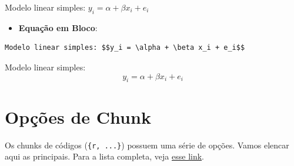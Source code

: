 \documentclass[]{book}
\providecommand{\tightlist}{%
  \setlength{\itemsep}{0pt}\setlength{\parskip}{0pt}}
\begin{document}
Modelo linear simples: \(y_i = \alpha + \beta x_i + e_i\)

\begin{itemize}
\tightlist
\item
  \textbf{Equação em Bloco}:
\end{itemize}

\begin{verbatim}
Modelo linear simples: $$y_i = \alpha + \beta x_i + e_i$$
\end{verbatim}

Modelo linear simples: \[y_i = \alpha + \beta x_i + e_i\]

\section{Opções de Chunk}\label{opcoes-de-chunk}

Os chunks de códigos (\texttt{\{r,\ ...\}}) possuem uma série de opções.
Vamos elencar aqui as principais. Para a lista completa, veja
\href{https://www.rstudio.com/wp-content/uploads/2015/03/rmarkdown-reference.pdf}{esse
link}.
\end{document}
